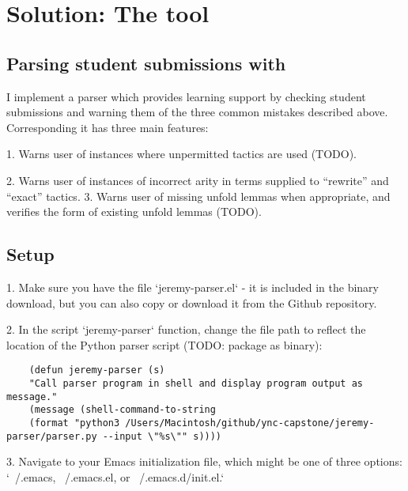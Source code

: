 
\chapter{Solution: The  tool} %

\label{solution} %


\section{Parsing student submissions with }

I implement a parser which provides learning support by checking student submissions and warning them of the three common mistakes described above. Corresponding it has three main features:

1. Warns user of instances where unpermitted tactics are used (TODO).

2. Warns user of instances of incorrect arity in terms supplied to “rewrite” and “exact” tactics.
3. Warns user of missing unfold lemmas when appropriate, and verifies the form of existing unfold lemmas (TODO).

\section{Setup}

1. Make sure you have the file `jeremy-parser.el` - it is included in the binary download, but you can also copy or download it from the Github repository.

2. In the script `jeremy-parser` function, change the file path to reflect the location of the Python parser script (TODO: package as binary):

\begin{lstlisting}
    (defun jeremy-parser (s)
    "Call parser program in shell and display program output as message."
    (message (shell-command-to-string
    (format "python3 /Users/Macintosh/github/ync-capstone/jeremy-parser/parser.py --input \"%s\"" s))))
\end{lstlisting}

3. Navigate to your Emacs initialization file, which might be one of three options: `~/.emacs, ~/.emacs.el, or ~/.emacs.d/init.el.`

